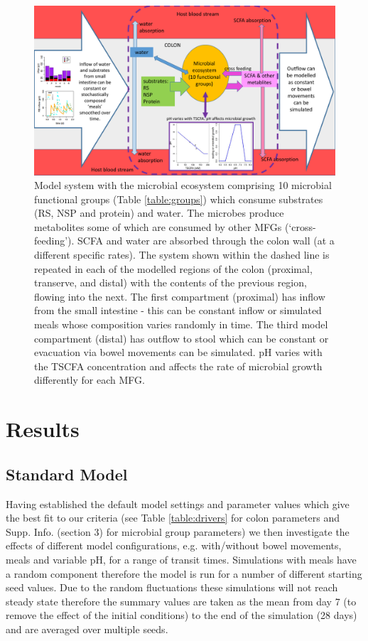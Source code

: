 \documentclass[a4paper]{article}
\begin{document}
\begin{figure}
    \centering
   \includegraphics[scale=0.3]{images/microbeEco4.pdf}
   \caption{Model system with the microbial ecosystem comprising 10 microbial functional groups (Table \ref{table:groups}) which consume substrates (RS, NSP and protein) and water. The microbes produce metabolites some of which are consumed by other MFGs (`cross-feeding'). SCFA and water are absorbed through the colon wall (at a different specific rates). The system shown within the dashed line is repeated in each of the modelled regions of the colon (proximal, transerve, and distal) with the contents of the previous region, flowing into the next. The first compartment (proximal) has inflow from the small intestine - this can be constant inflow or simulated meals whose composition varies randomly in time. The third model compartment (distal) has outflow to stool which can be constant or evacuation via bowel movements can be simulated. pH varies with the TSCFA concentration and affects the rate of microbial growth differently for each MFG.
    }
    \label{fig:schematic}
\end{figure}



\section*{Results} %


\subsection*{Standard Model}
Having established the default model settings and parameter values which give the best fit to our criteria (see Table \ref{table:drivers} for colon parameters and Supp. Info. (section 3) for microbial group parameters) we then investigate the effects of different model configurations, e.g. with/without bowel movements, meals and variable pH, for a range of transit times.
Simulations with meals have a random component therefore the model is run for a number of different starting seed values.
Due to the random fluctuations these simulations will not reach steady state therefore the summary values are taken as the mean from day 7 (to remove the effect of the initial conditions) to the end of the simulation (28 days) and are averaged over multiple seeds.
\end{document}
